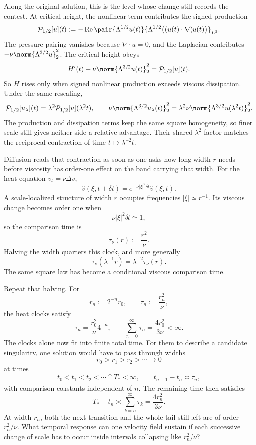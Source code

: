 
Along the original solution, this is the level whose change still records the contest. At critical height, the nonlinear term contributes the signed production
\[
  \mathcal P_{1/2}[u](t)
  :=
  -\operatorname{Re}
  \pair
    {\Lambda^{1/2}u(t)}
    {\Lambda^{1/2}\bigl((u(t)\cdot\nabla)u(t)\bigr)}_{L^2}.
\]
The pressure pairing vanishes because \(\nabla\cdot u=0\), and the Laplacian contributes \(-\nu\norm{\Lambda^{3/2}u}_2^2\). The critical height obeys
\[
  H'(t)
  +
  \nu\norm{\Lambda^{3/2}u(t)}_2^2
  =
  \mathcal P_{1/2}[u](t).
\]
So \(H\) rises only when signed nonlinear production exceeds viscous dissipation. Under the same rescaling,
\[
  \mathcal P_{1/2}[u_\lambda](t)
  =
  \lambda^2\mathcal P_{1/2}[u](\lambda^2t),
  \qquad
  \nu\norm{\Lambda^{3/2}u_\lambda(t)}_2^2
  =
  \lambda^2\nu\norm{\Lambda^{3/2}u(\lambda^2t)}_2^2.
\]
The production and dissipation terms keep the same square homogeneity, so finer scale still gives neither side a relative advantage. Their shared \(\lambda^2\) factor matches the reciprocal contraction of time \(t\mapsto\lambda^{-2}t\).


Diffusion reads that contraction as soon as one asks how long width \(r\) needs before viscosity has order-one effect on the band carrying that width. For the heat equation \(v_t=\nu\Delta v\),
\[
  \widehat v(\xi,t+\delta t)
  =
  e^{-\nu|\xi|^2\delta t}\widehat v(\xi,t).
\]
A scale-localized structure of width \(r\) occupies frequencies \(|\xi|\simeq r^{-1}\). Its viscous change becomes order one when
\[
  \nu|\xi|^2\delta t\simeq1,
\]
so the comparison time is
\[
  \tau_\nu(r)
  :=
  \frac{r^2}{\nu}.
\]
Halving the width quarters this clock, and more generally
\[
  \tau_\nu(\lambda^{-1}r)
  =
  \lambda^{-2}\tau_\nu(r).
\]
The same square law has become a conditional viscous comparison time.


Repeat that halving. For
\[
  r_n:=2^{-n}r_0,
  \qquad
  \tau_n:=\frac{r_n^2}{\nu},
\]
the heat clocks satisfy
\[
  \tau_n
  =
  \frac{r_0^2}{\nu}4^{-n},
  \qquad
  \sum_{n=0}^{\infty}\tau_n
  =
  \frac{4r_0^2}{3\nu}
  <
  \infty.
\]
The clocks alone now fit into finite total time. For them to describe a candidate singularity, one \NavierStokes{} solution would have to pass through widths
\[
  r_0>r_1>r_2>\cdots\longrightarrow0
\]
at times
\[
  t_0<t_1<t_2<\cdots\uparrow T_*<\infty,
  \qquad
  t_{n+1}-t_n\asymp\tau_n,
\]
with comparison constants independent of \(n\). The remaining time then satisfies
\[
  T_*-t_n
  \asymp
  \sum_{k=n}^{\infty}\tau_k
  =
  \frac{4r_n^2}{3\nu}.
\]
At width \(r_n\), both the next transition and the whole tail still left are of order \(r_n^2/\nu\). What temporal response can one velocity field sustain if each successive change of scale has to occur inside intervals collapsing like \(r_n^2/\nu\)?

